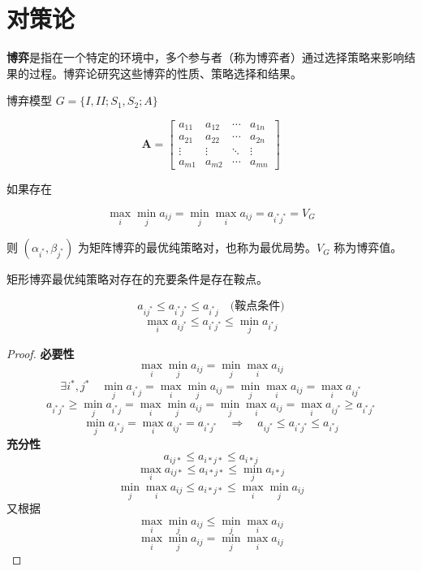 \documentclass[12pt, a4paper, oneside, UTF8]{ctexbook}
\begin{document}

\else
\fi

\chapter{对策论}

\begin{definition}
\label{def:game}
    \textbf{博弈}是指在一个特定的环境中，多个参与者（称为博弈者）通过选择策略来影响结果的过程。博弈论研究这些博弈的性质、策略选择和结果。
    
    博弃模型 \(G = \{I, II; S_1, S_2; A\}\)
\end{definition}

\[
\mathbf{A} = \begin{bmatrix}
a_{11} & a_{12} & \cdots & a_{1n} \\
a_{21} & a_{22} & \cdots & a_{2n} \\
\vdots & \vdots & \ddots & \vdots \\
a_{m1} & a_{m2} & \cdots & a_{mn}
\end{bmatrix}
\]

如果存在

$$
\max_{i} \min_{j} a_{ij} = \min_{j} \max_{i} a_{ij} = a_{i^* j^*} = V_G
$$

则 $(\alpha_{i^*}, \beta_{j^*})$ 为矩阵博弈的最优纯策略对，也称为最优局势。$V_G$ 称为博弈值。

矩形博弈最优纯策略对存在的充要条件是存在鞍点。

$$ a_{ij^*} \leq a_{i^*j^*} \leq a_{i^*j} \quad \text{(鞍点条件)} $$
$$ \max_{i} a_{ij^*} \leq a_{i^*j^*} \leq \min_{j} a_{i^*j} $$

\begin{proof}
    \textbf{必要性}
    $$
    \max_i \min_j a_{ij} = \min_j \max_i a_{ij}
    $$
    $$
    \exists i^*, j^* \quad \min_j a_{i^* j} = \max_i \min_j a_{ij} = \min_j \max_i a_{ij} = \max_i a_{i j^*}
    $$
    $$
    a_{i^* j^*} \geq \min_j a_{i^* j} = \max_i \min_j a_{ij} = \min_j \max_i a_{ij} = \max_i a_{i j^*} \geq a_{i^* j^*}
    $$
    $$
    \min_j a_{i^* j} = \max_i a_{i j^*} = a_{i^* j^*} \quad \Rightarrow \quad a_{i j^*} \leq a_{i^* j^*} \leq a_{i^* j}
    $$
    \textbf{充分性}
    \[ a_{ij*} \leq a_{i*j*} \leq a_{i*j} \]
    \[ \max_{i} a_{ij*} \leq a_{i*j*} \leq \min_{j} a_{i*j} \]
    \[ \min_{j} \max_{i} a_{ij} \leq a_{i*j*} \leq \max_{i} \min_{j} a_{ij} \]
    又根据 \[ \max_{i} \min_{j} a_{ij} \leq \min_{j} \max_{i} a_{ij} \]
    \[ \max_{i} \min_{j} a_{ij} = \min_{j} \max_{i} a_{ij} \]
\end{proof}
\end{document}
